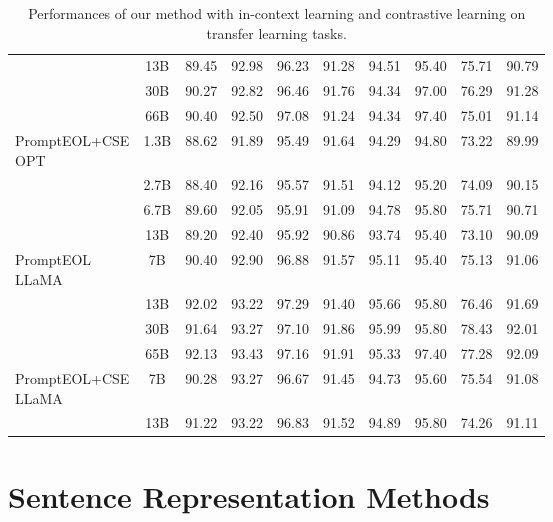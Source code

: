 \documentclass{article}
\begin{document}
\begin{table*}[h]
{\begin{tabular}{lccccccccc}
 &  13B  & 89.45 & 92.98 & 96.23 & 91.28 & 94.51 & 95.40 & 75.71 & 90.79\\
 &  30B  & 90.27 & 92.82 & 96.46 & 91.76 & 94.34 & 97.00 & 76.29 & 91.28\\
 &  66B  & 90.40 & 92.50 & 97.08 & 91.24 & 94.34 & 97.40 & 75.01 & 91.14\\
\midrule
\multirowcell{4}[0pt][l]{PromptEOL+CSE\\OPT}
 &  1.3B& 88.62 & 91.89 & 95.49 & 91.64 & 94.29 & 94.80 & 73.22 & 89.99 \\
 &  2.7B& 88.40 & 92.16 & 95.57 & 91.51 & 94.12 & 95.20 & 74.09 & 90.15 \\
 &  6.7B& 89.60 & 92.05 & 95.91 & 91.09 & 94.78 & 95.80 & 75.71 & 90.71 \\
 &  13B & 89.20 & 92.40 & 95.92 & 90.86 & 93.74 & 95.40 & 73.10 & 90.09 \\
\midrule
\multirowcell{4}[0pt][l]{PromptEOL\\LLaMA}
& 7B & 90.40 & 92.90 & 96.88 & 91.57 & 95.11 & 95.40 & 75.13 & 91.06 \\
& 13B & 92.02 & 93.22 & 97.29 & 91.40 & 95.66 & 95.80 & 76.46 & 91.69 \\
& 30B & 91.64 & 93.27 & 97.10 & 91.86 & 95.99 & 95.80 & 78.43 & 92.01 \\
& 65B & 92.13 & 93.43 & 97.16 & 91.91 & 95.33 & 97.40 & 77.28 & 92.09 \\
\midrule
\multirowcell{2}[0pt][l]{PromptEOL+CSE\\LLaMA}
& 7B & 90.28 & 93.27 & 96.67 & 91.45 & 94.73 & 95.60 & 75.54 & 91.08 \\
& 13B& 91.22 & 93.22 & 96.83 & 91.52 & 94.89 & 95.80 & 74.26 & 91.11 \\
\bottomrule
\end{tabular}}
\caption{ Performances of our method with in-context learning and contrastive learning on transfer learning tasks.
} \label{fig:transfer_icl_cse}
\end{table*}


\section{Sentence Representation Methods}\label{apx:sentence_rep}
\end{document}
